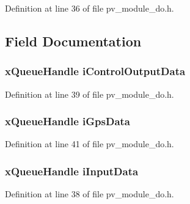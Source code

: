 Definition at line 36 of file pv\+\_\+module\+\_\+do.\+h.



\subsection{Field Documentation}
\subsubsection[{\texorpdfstring{i\+Control\+Output\+Data}{iControlOutputData}}]{\setlength{\rightskip}{0pt plus 5cm}x\+Queue\+Handle i\+Control\+Output\+Data}\hypertarget{structpv__interface__do_a47359dc53fe6c9e48eae67c40f5bde8a}{}\label{structpv__interface__do_a47359dc53fe6c9e48eae67c40f5bde8a}


Definition at line 39 of file pv\+\_\+module\+\_\+do.\+h.

\subsubsection[{\texorpdfstring{i\+Gps\+Data}{iGpsData}}]{\setlength{\rightskip}{0pt plus 5cm}x\+Queue\+Handle i\+Gps\+Data}\hypertarget{structpv__interface__do_a98e72320f39ff4a7ec39da06b878ff1b}{}\label{structpv__interface__do_a98e72320f39ff4a7ec39da06b878ff1b}


Definition at line 41 of file pv\+\_\+module\+\_\+do.\+h.

\subsubsection[{\texorpdfstring{i\+Input\+Data}{iInputData}}]{\setlength{\rightskip}{0pt plus 5cm}x\+Queue\+Handle i\+Input\+Data}\hypertarget{structpv__interface__do_ad057767ef15274f0933ad1821fea7239}{}\label{structpv__interface__do_ad057767ef15274f0933ad1821fea7239}


Definition at line 38 of file pv\+\_\+module\+\_\+do.\+h.


